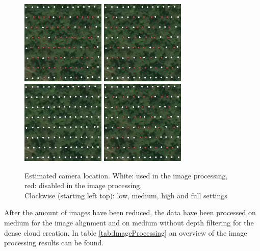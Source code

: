 \documentclass{isprs} %
\begin{document}
\begin{figure}[htp]
    \centering
    \includegraphics[width=4cm]{loc_low.png}
    \includegraphics[width=4cm]{loc_med.png}
    \includegraphics[width=4cm]{loc_full.png}
    \includegraphics[width=4cm]{loc_high.png}
    \caption{Estimated camera location. 
    White: used in the image processing, red: disabled in the image processing.\\
    Clockwise (starting left top): low, medium, high and full settings}
    \label{fig:cameralocation}
\end{figure}

After the amount of images have been reduced, the data have been processed on medium for the image alignment and on medium without depth filtering for the dense cloud creation.
In table \ref{tab:ImageProcessing} an overview of the image processing results can be found.
\end{document}
